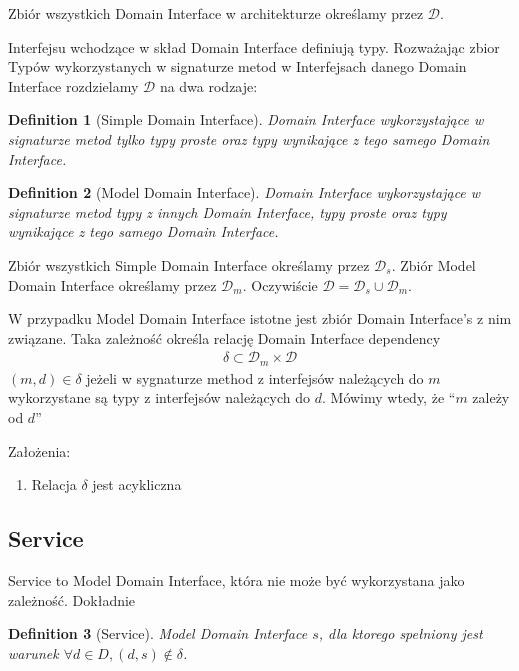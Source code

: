 \documentclass[a4paper,10pt]{article}
\newtheorem{defi}{Definition}[section]
\begin{document}
Zbiór wszystkich Domain Interface w architekturze określamy przez $\mathcal{D}$.

Interfejsu wchodzące w skład Domain Interface definiują typy. Rozważając zbior Typów wykorzystanych w signaturze metod w Interfejsach danego Domain Interface rozdzielamy $\mathcal{D}$ na dwa rodzaje:


\begin{defi}[Simple Domain Interface]
  Domain Interface wykorzystające w signaturze metod tylko typy proste oraz typy wynikające z tego samego Domain Interface.
\end{defi}

\begin{defi}[Model Domain Interface]
  Domain Interface wykorzystające w signaturze metod typy z innych Domain Interface, typy proste oraz typy wynikające z tego samego Domain Interface.
\end{defi}

Zbiór wszystkich Simple Domain Interface określamy przez $\mathcal{D}_s$. Zbiór Model Domain Interface określamy przez $\mathcal{D}_m$. Oczywiście $\mathcal{D} = \mathcal{D}_s \cup \mathcal{D}_m$.

W przypadku Model Domain Interface istotne jest zbiór Domain Interface's z nim związane. Taka zależność określa relację Domain Interface dependency
\begin{eqnarray}
\delta \subset \mathcal{D}_m \times \mathcal{D} 
\end{eqnarray}
$(m,d) \in \delta$ jeżeli w sygnaturze method z interfejsów należących do $m$ wykorzystane są typy z interfejsów należących do $d$. Mówimy wtedy, że ``$m$ zależy od $d$''

Założenia:
\begin{enumerate}
 \item Relacja $\delta$ jest acykliczna
\end{enumerate}

\subsection{Service}

Service to Model Domain Interface, która nie może być wykorzystana jako zależność. Dokładnie

\begin{defi}[Service]
  Model Domain Interface $s$, dla ktorego spełniony jest warunek $\forall d\in D,  (d,s) \notin \delta$.
\end{defi}
\end{document}
